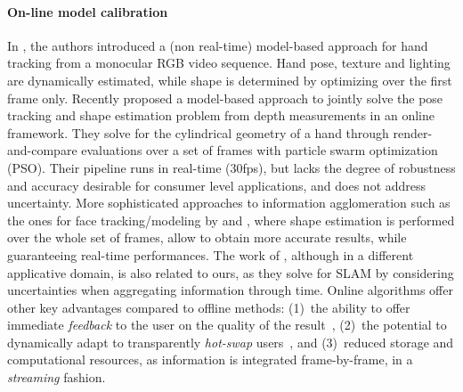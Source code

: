 \paragraph{On-line model calibration}
In \cite{delagorce2011model}, the authors introduced a (non real-time) model-based approach for hand tracking from a monocular RGB video sequence. Hand pose, texture and lighting are dynamically estimated, while shape is determined by optimizing over the first frame only.
Recently  proposed a model-based approach to jointly solve the pose tracking and shape estimation problem from depth measurements in an online framework. They solve for the cylindrical geometry of a hand through render-and-compare evaluations over a set of frames with particle swarm optimization (PSO). Their pipeline runs in real-time (30fps), but lacks the degree of robustness and accuracy desirable for consumer level applications, and does not address uncertainty.
More sophisticated approaches to information agglomeration such as the ones for face tracking/modeling by  and , where shape estimation is performed over the whole set of frames, allow to obtain more accurate results, while guaranteeing real-time performances.
The work of , although in a different applicative domain, is also related to ours, as they solve for SLAM by considering uncertainties when aggregating information through time.
Online algorithms offer other key advantages compared to offline methods: (1)~the ability to offer immediate \emph{feedback} to the user on the quality of the result~\cite{kinfu}, (2)~the potential to dynamically adapt to transparently \emph{hot-swap} users~\cite{bouaziz2013online}, and (3)~reduced storage and computational resources, as information is integrated frame-by-frame, in a \emph{streaming} fashion.



